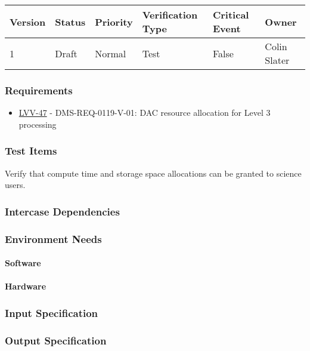 \begin{longtable}[]{llllll}
\toprule
Version & Status & Priority & Verification Type & Critical Event & Owner
\\\midrule
1 & Draft & Normal &
Test & False & Colin Slater
\\\bottomrule
\end{longtable}

\subsubsection{Requirements}
\begin{itemize}
\item \href{https://jira.lsstcorp.org/browse/LVV-47}{LVV-47} - DMS-REQ-0119-V-01: DAC resource allocation for Level 3 processing
\end{itemize}

\subsubsection{Test Items}
Verify that compute time and storage space allocations can be granted to
science users.



\subsubsection{Intercase Dependencies}

\subsubsection{Environment Needs}

\paragraph{Software}

\paragraph{Hardware}

\subsubsection{Input Specification}

\subsubsection{Output Specification}

